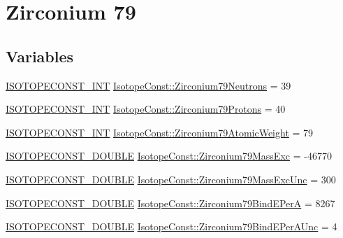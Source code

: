 \hypertarget{group___isotope_const-_zirconium-_zr79}{}\section{Zirconium 79}
\label{group___isotope_const-_zirconium-_zr79}
\subsection*{Variables}
\begin{DoxyCompactItemize}
\item 
\mbox{\hyperlink{group___isotope_const-_macros_ga5f18360b3e99483a35c32d789e62621c}{I\+S\+O\+T\+O\+P\+E\+C\+O\+N\+S\+T\+\_\+\+I\+NT}} \mbox{\hyperlink{group___isotope_const-_zirconium-_zr79_ga3026bd27710afa7d2a97ef9d8fdbfac5}{Isotope\+Const\+::\+Zirconium79\+Neutrons}} = 39
\item 
\mbox{\hyperlink{group___isotope_const-_macros_ga5f18360b3e99483a35c32d789e62621c}{I\+S\+O\+T\+O\+P\+E\+C\+O\+N\+S\+T\+\_\+\+I\+NT}} \mbox{\hyperlink{group___isotope_const-_zirconium-_zr79_ga777cef93fb3bd3a1607be246cb507846}{Isotope\+Const\+::\+Zirconium79\+Protons}} = 40
\item 
\mbox{\hyperlink{group___isotope_const-_macros_ga5f18360b3e99483a35c32d789e62621c}{I\+S\+O\+T\+O\+P\+E\+C\+O\+N\+S\+T\+\_\+\+I\+NT}} \mbox{\hyperlink{group___isotope_const-_zirconium-_zr79_gad140427d67c40a8d82fce63e6e8378d3}{Isotope\+Const\+::\+Zirconium79\+Atomic\+Weight}} = 79
\item 
\mbox{\hyperlink{group___isotope_const-_macros_ga8f45a7272ce02c0b4c65c44636ed719a}{I\+S\+O\+T\+O\+P\+E\+C\+O\+N\+S\+T\+\_\+\+D\+O\+U\+B\+LE}} \mbox{\hyperlink{group___isotope_const-_zirconium-_zr79_gaf2ef0be99d6ea3f2467356e7bd440b50}{Isotope\+Const\+::\+Zirconium79\+Mass\+Exc}} = -\/46770
\item 
\mbox{\hyperlink{group___isotope_const-_macros_ga8f45a7272ce02c0b4c65c44636ed719a}{I\+S\+O\+T\+O\+P\+E\+C\+O\+N\+S\+T\+\_\+\+D\+O\+U\+B\+LE}} \mbox{\hyperlink{group___isotope_const-_zirconium-_zr79_gac27630f399c4ecde1515d7a6450e8ee5}{Isotope\+Const\+::\+Zirconium79\+Mass\+Exc\+Unc}} = 300
\item 
\mbox{\hyperlink{group___isotope_const-_macros_ga8f45a7272ce02c0b4c65c44636ed719a}{I\+S\+O\+T\+O\+P\+E\+C\+O\+N\+S\+T\+\_\+\+D\+O\+U\+B\+LE}} \mbox{\hyperlink{group___isotope_const-_zirconium-_zr79_gabee8625a633944ba4705ec3fe4265947}{Isotope\+Const\+::\+Zirconium79\+Bind\+E\+PerA}} = 8267
\item 
\mbox{\hyperlink{group___isotope_const-_macros_ga8f45a7272ce02c0b4c65c44636ed719a}{I\+S\+O\+T\+O\+P\+E\+C\+O\+N\+S\+T\+\_\+\+D\+O\+U\+B\+LE}} \mbox{\hyperlink{group___isotope_const-_zirconium-_zr79_ga7e57df96acec2235203abfc1a8c2fe8b}{Isotope\+Const\+::\+Zirconium79\+Bind\+E\+Per\+A\+Unc}} = 4

\end{DoxyCompactItemize}
